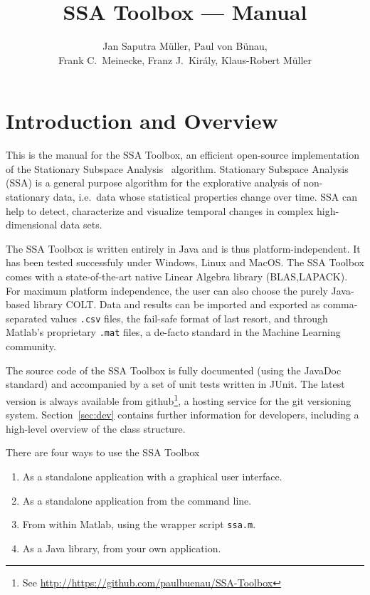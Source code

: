 \documentclass{article}
\newcommand{\1}{\ensuremath{\mathds{1}}}
\newcommand{\0}{\ensuremath{0}}
\begin{document}
\title{SSA Toolbox  --- Manual}
\author{Jan Saputra M\"uller, Paul von B\"unau, \\ Frank C.~Meinecke, Franz J.~Kir\'{a}ly, Klaus-Robert M\"uller}

\maketitle

\tableofcontents

\newpage

\section{Introduction and Overview}

This is the manual for the SSA Toolbox, an efficient open-source implementation of the 
Stationary Subspace Analysis~\cite{PRL:SSA:2009} algorithm. Stationary Subspace Analysis (SSA)
is a general purpose algorithm for the explorative analysis of non-stationary data, i.e.~data
whose statistical properties change over time. SSA can help to detect, characterize and 
visualize temporal changes in complex high-dimensional data sets.

The SSA Toolbox is written entirely in Java and is thus platform-independent. It has been tested
successfuly under Windows, Linux and MacOS. The SSA Toolbox comes with a state-of-the-art native 
Linear Algebra library (BLAS,LAPACK). For maximum platform independence, the user can also 
choose the purely Java-based library COLT.  
Data and results can be imported and exported as comma-separated values \texttt{.csv} files, the fail-safe 
format of last resort, and through Matlab's proprietary \texttt{.mat} files, a de-facto standard in the 
Machine Learning community.

The source code of the SSA Toolbox is fully documented (using the JavaDoc standard) and accompanied
by a set of unit tests written in JUnit. The latest version is always available from 
github\footnote{See \url{http://https://github.com/paulbuenau/SSA-Toolbox}}, a hosting service for
the git versioning system. Section~\ref{sec:dev} contains further information for developers, 
including a high-level overview of the class structure.
 
There are four ways to use the SSA Toolbox
\begin{enumerate}
	\item As a standalone application with a graphical user interface.

	\item As a standalone application from the command line.
	 
	\item From within Matlab, using the wrapper script \texttt{ssa.m}. 

	\item As a Java library, from your own application.
\end{enumerate}
\end{document}
